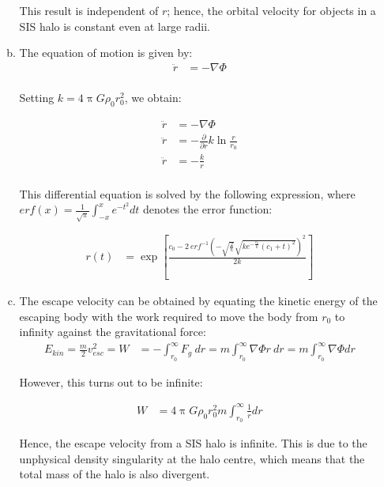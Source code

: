 \documentclass[a4paper,12pt]{article}
\renewcommand{\pi}{\uppi}
\begin{document}
\begin{enumerate}
\begin{enumerate}[(a)]
			This result is independent of $r$; hence, the orbital velocity for objects in a SIS halo is constant even 				at large radii.
			
			\item The equation of motion is given by:
			\begin{align*}
			\ddot{r} &= - \nabla \Phi \\
			\end{align*}

			Setting $k = 4 \pi G \rho_0 r_0^2$, we obtain:
			
			\begin{align*}
			\ddot{r} &= - \nabla \Phi \\
			\ddot{r} &= - \frac{\partial}{\partial r} k \ln \frac{r}{r_0} \\
			\ddot{r} &= - \frac{k}{r} \\
			\end{align*}

			This differential equation is solved by the following expression, where $erf(x) = \frac{1}{\sqrt{\pi}} \int_{-x}^{x} e^{-t^2}dt$ denotes the error function: 
			
			\begin{align*}
			r(t) &= \exp\left[\frac{c_0 - 2 \ erf^{-1}\left(-\sqrt{\frac{2}{\pi}} \sqrt{k e^{-\frac{c_0}{k}}(c_1 + t)^2}\right)^2}{2 k}\right]
			\end{align*}
			
			\item The escape velocity can be obtained by equating the kinetic energy of the escaping body with the work required to move the body from $r_0$ to infinity against the gravitational force: 
			\begin{align*}
			E_{kin} = \frac{m}{2} v_{esc}^2 = W &= - \int_{r_0}^{\infty} F_g \ dr = m \int_{r_0}^{\infty} \nabla \Phi  r \ dr = m \int_{r_0}^{\infty} \nabla \Phi dr 
			\end{align*}
			
			However, this turns out to be infinite: 
			
			\begin{align*}
			W &= 4 \pi G \rho_0 r_0^2 m \int_{r_0}^{\infty} \frac{1}{r} dr
			\end{align*}
			
			Hence, the escape velocity from a SIS halo is infinite. This is due to the unphysical density singularity at the halo centre, which means that the total mass of the halo is also divergent. 
			
		\end{enumerate}
		

\end{enumerate}
\end{document}
